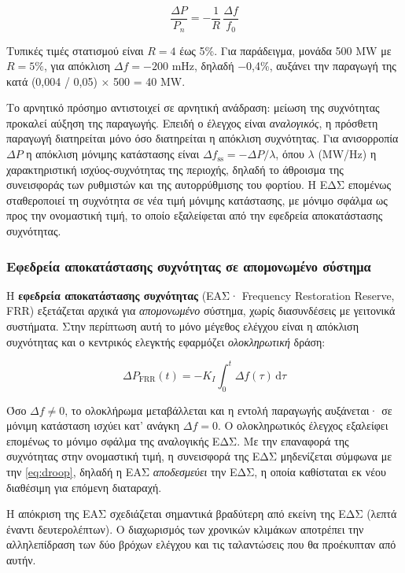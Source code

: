\begin{equation}
\frac{\Delta P}{P_n} = -\frac{1}{R}\,\frac{\Delta f}{f_0}
\label{eq:droop}
\end{equation}

Τυπικές τιμές στατισμού είναι $R = 4$ έως 5\%. Για παράδειγμα, μονάδα 500 MW με $R = 5\%$,
για απόκλιση $\Delta f = -200$ mHz, δηλαδή −0,4\%, αυξάνει την παραγωγή της κατά
(0,004 / 0,05) × 500 = 40 MW.

Το αρνητικό πρόσημο αντιστοιχεί σε αρνητική ανάδραση: μείωση της συχνότητας προκαλεί αύξηση
της παραγωγής. Επειδή ο έλεγχος είναι \emph{αναλογικός}, η πρόσθετη παραγωγή διατηρείται μόνο
όσο διατηρείται η απόκλιση συχνότητας. Για ανισορροπία $\Delta P$ η απόκλιση μόνιμης
κατάστασης είναι $\Delta f_{\mathrm{ss}} = -\Delta P / \lambda$, όπου $\lambda$ (MW/Hz) η
χαρακτηριστική ισχύος-συχνότητας της περιοχής, δηλαδή το άθροισμα της συνεισφοράς των
ρυθμιστών και της αυτορρύθμισης του φορτίου. Η ΕΔΣ επομένως σταθεροποιεί τη συχνότητα σε
νέα τιμή μόνιμης κατάστασης, με μόνιμο σφάλμα ως προς την ονομαστική τιμή, το οποίο
εξαλείφεται από την εφεδρεία αποκατάστασης συχνότητας.

\subsubsection*{Εφεδρεία αποκατάστασης συχνότητας σε απομονωμένο σύστημα}

Η \textbf{εφεδρεία αποκατάστασης συχνότητας} (ΕΑΣ· Frequency Restoration Reserve, FRR)
εξετάζεται αρχικά για \emph{απομονωμένο} σύστημα, χωρίς διασυνδέσεις με γειτονικά
συστήματα. Στην περίπτωση αυτή το μόνο μέγεθος ελέγχου είναι η απόκλιση συχνότητας και ο
κεντρικός ελεγκτής εφαρμόζει \emph{ολοκληρωτική} δράση:

\begin{equation}
\Delta P_{\mathrm{FRR}}(t) = -K_I \int_0^{t} \Delta f(\tau)\,\mathrm{d}\tau
\label{eq:frr-isolated}
\end{equation}

Όσο $\Delta f \neq 0$, το ολοκλήρωμα μεταβάλλεται και η εντολή παραγωγής αυξάνεται· σε μόνιμη
κατάσταση ισχύει κατ' ανάγκη $\Delta f = 0$. Ο ολοκληρωτικός έλεγχος εξαλείφει επομένως το
μόνιμο σφάλμα της αναλογικής ΕΔΣ. Με την επαναφορά της συχνότητας στην ονομαστική τιμή, η
συνεισφορά της ΕΔΣ μηδενίζεται σύμφωνα με την \eqref{eq:droop}, δηλαδή η ΕΑΣ
\emph{αποδεσμεύει} την ΕΔΣ, η οποία καθίσταται εκ νέου διαθέσιμη για επόμενη διαταραχή.

Η απόκριση της ΕΑΣ σχεδιάζεται σημαντικά βραδύτερη από εκείνη της ΕΔΣ (λεπτά έναντι
δευτερολέπτων). Ο διαχωρισμός των χρονικών κλιμάκων αποτρέπει την αλληλεπίδραση των δύο
βρόχων ελέγχου και τις ταλαντώσεις που θα προέκυπταν από αυτήν.

